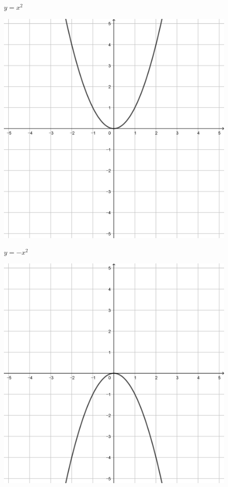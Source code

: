 \documentclass[a4paper]{oblivoir}
\begin{document}
\begin{minipage}{0.45\textwidth}\centering
\(y=x^2\)
\par\bigskip\includegraphics[width=0.9\textwidth]{img/6-3}
\end{minipage}
\begin{minipage}{0.45\textwidth}\centering
\(y=-x^2\)
\par\bigskip\includegraphics[width=0.9\textwidth]{img/6-4}
\end{minipage}\bigskip\bigskip\par
\end{document}
